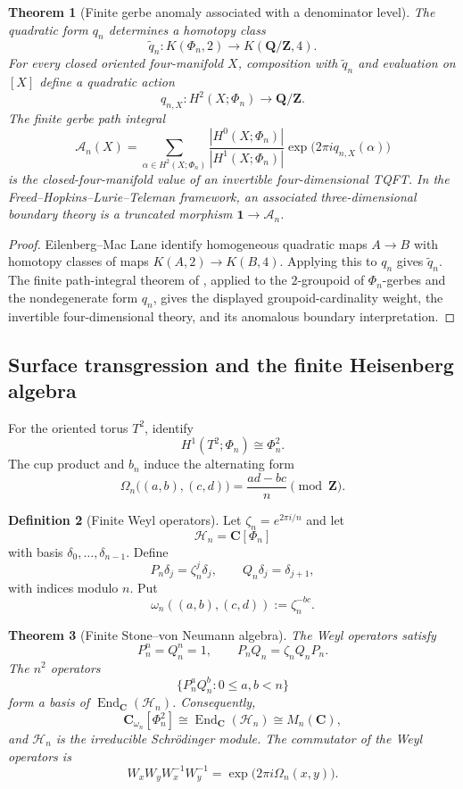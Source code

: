 \documentclass[11pt]{amsart}
\numberwithin{equation}{section}
\newtheorem{theorem}{Theorem}[section]
\theoremstyle{definition}
\newtheorem{definition}[theorem]{Definition}
\newcommand{\Z}{\mathbf Z}
\newcommand{\Q}{\mathbf Q}
\newcommand{\C}{\mathbf C}
\newcommand{\End}{\operatorname{End}}
\begin{document}
\begin{theorem}[Finite gerbe anomaly associated with a denominator level]
\label{thm:finite-gerbe-anomaly}
The quadratic form $q_n$ determines a homotopy class
\[
\widetilde q_n:K(\Phi_n,2)\longrightarrow K(\Q/\Z,4).
\]
For every closed oriented four-manifold $X$, composition with
$\widetilde q_n$ and evaluation on $[X]$ define a quadratic action
\[
q_{n,X}:H^2(X;\Phi_n)\longrightarrow\Q/\Z.
\]
The finite gerbe path integral
\[
\mathcal A_n(X)
=
\sum_{\alpha\in H^2(X;\Phi_n)}
\frac{|H^0(X;\Phi_n)|}{|H^1(X;\Phi_n)|}
\exp\bigl(2\pi i q_{n,X}(\alpha)\bigr)
\]
is the closed-four-manifold value of an invertible four-dimensional TQFT.
In the Freed--Hopkins--Lurie--Teleman framework, an associated
three-dimensional boundary theory is a truncated morphism
$\mathbf1\to\mathcal A_n$.
\end{theorem}

\begin{proof}
Eilenberg--Mac Lane identify homogeneous quadratic maps $A\to B$ with
homotopy classes of maps $K(A,2)\to K(B,4)$.  Applying this to $q_n$
gives $\widetilde q_n$.  The finite path-integral theorem of
\cite{FHLT}, applied to the $2$-groupoid of $\Phi_n$-gerbes and the
nondegenerate form $q_n$, gives the displayed groupoid-cardinality weight,
the invertible four-dimensional theory, and its anomalous boundary
interpretation.
\end{proof}

\subsection{Surface transgression and the finite Heisenberg algebra}

For the oriented torus $T^2$, identify
\[
H^1(T^2;\Phi_n)\cong\Phi_n^2.
\]
The cup product and $b_n$ induce the alternating form
\[
\Omega_n\bigl((a,b),(c,d)\bigr)
=\frac{ad-bc}{n}\pmod\Z.
\]

\begin{definition}[Finite Weyl operators]
Let $\zeta_n=e^{2\pi i/n}$ and let
\[
\mathscr H_n=\C[\Phi_n]
\]
with basis $\delta_0,\dots,\delta_{n-1}$.  Define
\[
P_n\delta_j=\zeta_n^j\delta_j,
\qquad
Q_n\delta_j=\delta_{j+1},
\]
with indices modulo $n$.  Put
\[
\omega_n((a,b),(c,d)):=\zeta_n^{-bc}.
\]
\end{definition}

\begin{theorem}[Finite Stone--von Neumann algebra]
\label{thm:finite-stone-von-neumann}
The Weyl operators satisfy
\[
P_n^n=Q_n^n=1,
\qquad
P_nQ_n=\zeta_n Q_nP_n.
\]
The $n^2$ operators
\[
\{P_n^aQ_n^b:0\leq a,b<n\}
\]
form a basis of $\End_\C(\mathscr H_n)$.  Consequently,
\[
\C_{\omega_n}[\Phi_n^2]
\cong
\End_\C(\mathscr H_n)
\cong M_n(\C),
\]
and $\mathscr H_n$ is the irreducible Schr\"odinger module.  The
commutator of the Weyl operators is
\[
W_xW_yW_x^{-1}W_y^{-1}
=\exp\bigl(2\pi i\Omega_n(x,y)\bigr).
\]
\end{theorem}
\end{document}
